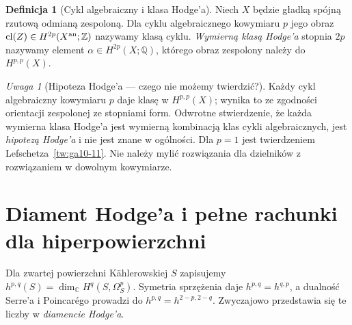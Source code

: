 \documentclass[11pt,a4paper,openany]{report}
\numberwithin{equation}{section}
\theoremstyle{plain}
\theoremstyle{definition}
\newtheorem{definicja}[twierdzenie]{Definicja}
\theoremstyle{remark}
\newtheorem{uwaga}[twierdzenie]{Uwaga}
\newcommand{\Z}{\mathbb Z}
\newcommand{\Q}{\mathbb Q}
\newcommand{\C}{\mathbb C}
\begin{document}
\begin{definicja}[Cykl algebraiczny i klasa Hodge'a]
Niech $X$ będzie gładką spójną rzutową odmianą zespoloną.
Dla cyklu algebraicznego kowymiaru $p$ jego obraz
$\operatorname{cl}(Z)\in H^{2p}(X^{\rm an};\Z)$
nazywamy klasą cyklu. \emph{Wymierną klasą Hodge'a}
stopnia $2p$ nazywamy element
$\alpha\in H^{2p}(X;\Q)$, którego obraz zespolony
należy do $H^{p,p}(X)$.
\end{definicja}

\begin{uwaga}[Hipoteza Hodge'a — czego nie możemy twierdzić?]
Każdy cykl algebraiczny kowymiaru $p$ daje klasę
w $H^{p,p}(X)$; wynika to ze zgodności orientacji
zespolonej ze stopniami form. Odwrotne stwierdzenie,
że każda wymierna klasa Hodge'a jest wymierną kombinacją
klas cykli algebraicznych, jest \emph{hipotezą Hodge'a}
i nie jest znane w ogólności. Dla $p=1$ jest twierdzeniem
Lefschetza~\ref{tw:ga10-11}. Nie należy mylić
rozwiązania dla dzielników z rozwiązaniem
w dowolnym kowymiarze.
\end{uwaga}

\section{Diament Hodge'a i pełne rachunki dla hiperpowierzchni}
\label{sec:ga10-hodge-numbers}

Dla zwartej powierzchni Kählerowskiej $S$ zapisujemy
$h^{p,q}(S)=\dim_{\C}H^q(S,\Omega^p_S)$.
Symetria sprzężenia daje $h^{p,q}=h^{q,p}$,
a dualność Serre'a i Poincarégo prowadzi do
$h^{p,q}=h^{2-p,2-q}$. Zwyczajowo przedstawia się te
liczby w \emph{diamencie Hodge'a}.
\end{document}
